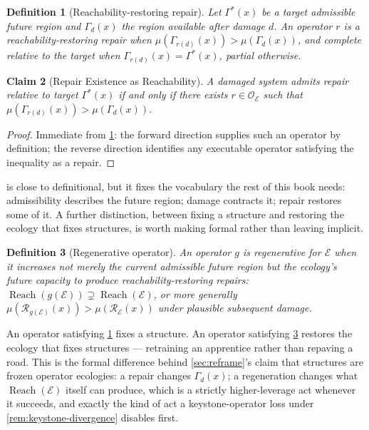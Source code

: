 \documentclass[12pt]{report}
\newtheorem{definition}{Definition}[section]
\newtheorem{claim}[definition]{Claim}
\newcommand{\Reach}{\ensuremath{\operatorname{Reach}}}
\begin{document}
\begin{definition}[Reachability-restoring repair]
\label{def:reach-restoring-repair}
Let $\Gamma^*(x)$ be a target admissible future region and $\Gamma_d(x)$
the region available after damage $d$. An operator $r$ is a
\emph{reachability-restoring repair} when $\mu(\Gamma_{r(d)}(x)) >
\mu(\Gamma_d(x))$, and \emph{complete} relative to the target when
$\Gamma_{r(d)}(x) = \Gamma^*(x)$, partial otherwise.
\end{definition}

\begin{claim}[Repair Existence as Reachability]
\label{thm:repair-existence-reach}
A damaged system admits repair relative to target $\Gamma^*(x)$ if and
only if there exists $r \in \mathcal{O}_\mathcal{E}$ such that
$\mu(\Gamma_{r(d)}(x)) > \mu(\Gamma_d(x))$.
\end{claim}

\begin{proof}
Immediate from \cref{def:reach-restoring-repair}: the forward direction
supplies such an operator by definition; the reverse direction
identifies any executable operator satisfying the inequality as a
repair.
\end{proof}

 is close to definitional, but it fixes
the vocabulary the rest of this book needs: admissibility describes the
future region; damage contracts it; repair restores some of it. A further
distinction, between fixing a structure and restoring the ecology that
fixes structures, is worth making formal rather than leaving implicit.

\begin{definition}[Regenerative operator]
\label{def:regenerative-operator}
An operator $g$ is \emph{regenerative} for $\mathcal{E}$ when it
increases not merely the current admissible future region but the
ecology's future capacity to produce reachability-restoring repairs:
$\Reach(g(\mathcal{E})) \supsetneq \Reach(\mathcal{E})$, or more
generally $\mu(\mathcal{R}_{g(\mathcal{E})}(x)) >
\mu(\mathcal{R}_\mathcal{E}(x))$ under plausible subsequent damage.
\end{definition}

An operator satisfying \cref{def:reach-restoring-repair} fixes a
structure. An operator satisfying \cref{def:regenerative-operator}
restores the ecology that fixes structures --- retraining an apprentice
rather than repaving a road. This is the formal difference behind
\cref{sec:reframe}'s claim that structures are frozen operator ecologies:
a repair changes $\Gamma_d(x)$; a regeneration changes what $\Reach(\mathcal{E})$
itself can produce, which is a strictly higher-leverage act whenever it
succeeds, and exactly the kind of act a keystone-operator loss under
\cref{rem:keystone-divergence} disables first.
\end{document}
